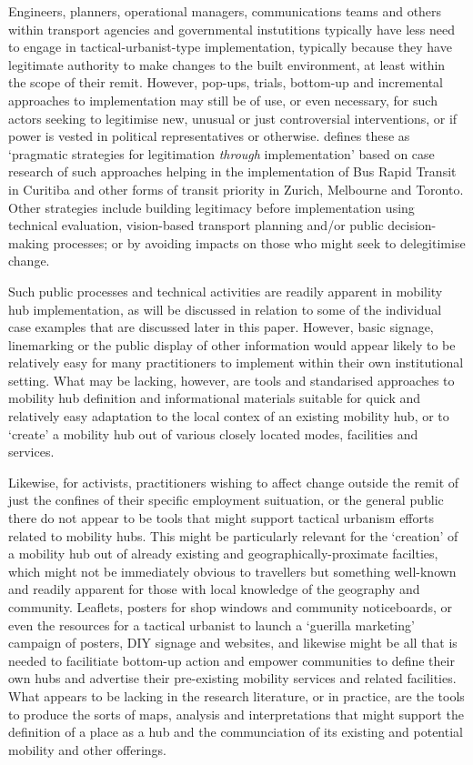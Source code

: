 \documentclass[preprint, 3p,
authoryear]{elsarticle} %
\begin{document}
Engineers, planners, operational managers, communications teams and
others within transport agencies and governmental instutitions typically
have less need to engage in tactical-urbanist-type implementation,
typically because they have legitimate authority to make changes to the
built environment, at least within the scope of their remit. However,
pop-ups, trials, bottom-up and incremental approaches to implementation
may still be of use, or even necessary, for such actors seeking to
legitimise new, unusual or just controversial interventions, or if power
is vested in political representatives or otherwise.
\cite{Reynolds:2020aa,Reynolds:2021ab} defines these as `pragmatic
strategies for legitimation \emph{through} implementation' based on case
research of such approaches helping in the implementation of Bus Rapid
Transit in Curitiba and other forms of transit priority in Zurich,
Melbourne and Toronto. Other strategies include building legitimacy
before implementation using technical evaluation, vision-based transport
planning and/or public decision-making processes; or by avoiding impacts
on those who might seek to delegitimise change.

Such public processes and technical activities are readily apparent in
mobility hub implementation, as will be discussed in relation to some of
the individual case examples that are discussed later in this paper.
However, basic signage, linemarking or the public display of other
information would appear likely to be relatively easy for many
practitioners to implement within their own institutional setting. What
may be lacking, however, are tools and standarised approaches to
mobility hub definition and informational materials suitable for quick
and relatively easy adaptation to the local contex of an existing
mobility hub, or to `create' a mobility hub out of various closely
located modes, facilities and services.

Likewise, for activists, practitioners wishing to affect change outside
the remit of just the confines of their specific employment suituation,
or the general public there do not appear to be tools that might support
tactical urbanism efforts related to mobility hubs. This might be
particularly relevant for the `creation' of a mobility hub out of
already existing and geographically-proximate facilties, which might not
be immediately obvious to travellers but something well-known and
readily apparent for those with local knowledge of the geography and
community. Leaflets, posters for shop windows and community
noticeboards, or even the resources for a tactical urbanist to launch a
`guerilla marketing' campaign of posters, DIY signage and websites, and
likewise might be all that is needed to facilitiate bottom-up action and
empower communities to define their own hubs and advertise their
pre-existing mobility services and related facilities. What appears to
be lacking in the research literature, or in practice, are the tools to
produce the sorts of maps, analysis and interpretations that might
support the definition of a place as a hub and the communciation of its
existing and potential mobility and other offerings.
\end{document}
